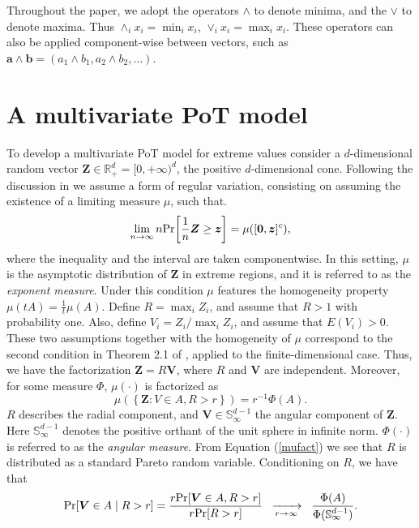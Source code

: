 Throughout the paper, we adopt the operators $\wedge$ to denote minima, and the $\vee$
  to denote maxima.  Thus $\wedge_i x_i = \min_i x_i$, $\vee_i x_i = \max_i x_i$.  These operators can
  also be applied component-wise between vectors, such as $\bm{a}\wedge\bm{b} = (a_1\wedge b_1, a_2\wedge b_2,\ldots)$.
  
\section{A multivariate PoT model\label{sec:multivariatepot}}
To develop a multivariate PoT model for extreme values consider a $d$-dimensional random vector $\bm{Z} \in {\mathbb R}^d_+ = [0,+\infty)^d$, the positive $d$-dimensional cone. Following the discussion in \cite{goix2017} we assume a form of regular variation, consisting on assuming the existence of a limiting measure $\mu$, such that.
\[
    \lim\limits_{n\to\infty}n\prob{\frac{1}{n}\bm{Z}\geq \bm{z}} = \mu\left([\bm{0},\bm{z}]^c\right),
\]
where the inequality and the interval are taken componentwise. 
In this setting, $\mu$ is the asymptotic distribution of $\bm{Z}$ in extreme regions, and it is referred to as the
  \emph{exponent measure}. Under this condition $\mu$ features the homogeneity property $\mu(tA) = \frac{1}{t}\mu(A)$. 
Define  $R = \max_{i} Z_i$, and assume that $R>1$ with probability one. Also, define $V_i = Z_i/\max_i Z_i$, and assume that $E(V_i)>0$.
These two assumptions together with the homogeneity of $\mu$ correspond to the second condition in Theorem 2.1 of
\cite{ferreira2014}, applied to the finite-dimensional case.
Thus, we have the factorization $\bm{Z} =  R\bm{V}$, where $R$ and $\bm{V}$  are independent. Moreover,
for some measure $\Phi$, $\mu(\cdot)$ is factorized as
\begin{equation}\label{mufact}
    \mu\left( \left\lbrace\bm{Z} : V \in A , R > r\right\rbrace \right) = r^{-1}\Phi(A).
\end{equation}
$R$ describes the radial component, and $\bm{V} \in {\mathbb S}_{\infty}^{d-1}$ the 
angular component of $\bm{Z}$.  Here ${\mathbb S}_\infty^{d-1}$ denotes the positive
orthant of the unit sphere in infinite norm.  $\Phi(\cdot)$ is referred to as the \emph{angular measure}.   
From Equation (\ref{mufact}) we see that $R$ is distributed as a standard Pareto random variable. Conditioning on $R$, we have that
\begin{equation} \label{MGP}
    \prob{\bm{V} \in A \mid R > r} = \frac{r\prob{\bm{V} \in A, R > r}}{r\prob{R > r}}\hspace{0.2cm}
      \xrightarrow[r\to\infty]{~} \hspace{0.2cm} \frac{\Phi(A)}{\Phi({\mathbb S}_{\infty}^{d-1})}.
\end{equation}

